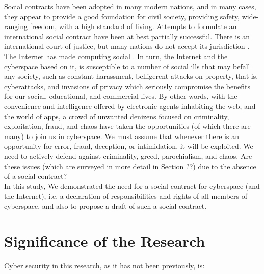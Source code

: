Social contracts have been adopted in many modern nations, and in many cases, they appear to provide a good foundation for civil society, providing safety, wide-ranging freedom, with a high standard of living. Attempts to formulate an international social contract have been at best partially successful. There is an international court of justice, but many nations do not accept its jurisdiction \cite{Robertson}.
\if
The Internet has made computing social  \cite{parameswaran2007social}. In turn, the Internet and the cyberspace based on it, is susceptible to a number of social ills that may befall any society, such as constant harassment, belligerent attacks on property, that is, cyberattacks, and invasions of privacy which seriously compromise the benefits for our social, educational, and commercial lives. By other words, with the convenience and intelligence offered by electronic agents inhabiting the web, and the world of apps, a crowd of unwanted denizens focused on criminality, exploitation, fraud, and chaos have taken the opportunities (of which there are many) to join us in cyberspace.  We must assume that whenever there is an opportunity for error, fraud, deception, or intimidation, it will be exploited. We need to actively defend against criminality, greed, parochialism, and chaos. Are these issues (which are surveyed in more detail in Section ??) due to the absence of a social contract? \\ In this study, We demonstrated the need for a social contract for cyberspace (and the Internet), i.e. a declaration of responsibilities and rights of all members of cyberspace, and also to propose a draft of such a social contract.
\fi

\section{Significance of the Research}

Cyber security in this research, as it has not been previously, is:



